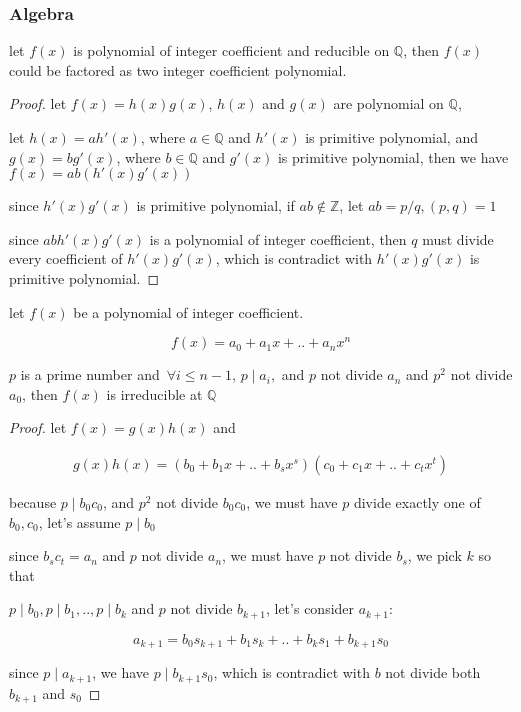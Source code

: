 \subsubsection{Algebra}

\begin{exercise}
let $f(x)$ is polynomial of integer coefficient and reducible on $\mathbb{Q}$, then $f(x)$ could be factored 
as two integer coefficient polynomial.
\end{exercise}

\begin{proof}
    let $f(x) = h(x)g(x)$, $h(x)$ and $g(x)$ are polynomial on $\mathbb{Q}$,    

    let $h(x) = a h'(x)$, where $a \in \mathbb{Q}$ and $h'(x)$ is primitive polynomial, 
    and $g(x) = b g'(x)$, where $b \in \mathbb{Q}$ and $g'(x)$ is primitive polynomial, 
    then we have $f(x) = ab\left(h'(x) g'(x) \right)$

    since $h'(x)g'(x)$ is primitive polynomial, if $ab \notin \mathbb{Z}$, let $ab = p/q, (p, q) = 1$

    since $ab h'(x)g'(x)$ is a polynomial of integer coefficient, then $q$ must divide every coefficient of $h'(x)g'(x)$,
    which is contradict with $h'(x)g'(x)$ is primitive polynomial.

\end{proof}

\begin{exercise}
    let $f(x)$ be a polynomial of integer coefficient. 

    \[
        f(x) = a_0 + a_1x + .. + a_nx^{n}
    \]
    
    $p$ is a prime number and $\, \forall i \le n -1,\, p \mid a_i,$ and $p$ not divide $a_n$ and $p^2$ not divide $a_0$,
    then $f(x)$ is irreducible at $\mathbb{Q}$
\end{exercise}

\begin{proof}
    let $f(x)= g(x)h(x)$ and

    \begin{align*}
        g(x)h(x)= \left(b_0 + b_1x+ .. + b_sx^s \right)\left(c_0 + c_1x+ .. + c_tx^t \right)
    \end{align*}

    because $p \mid b_0c_0$, and $p^2$ not divide $b_0c_0$, we must have $p$ divide exactly one of $b_0, c_0$,
    let's assume $p \mid b_0$

    since $b_sc_t = a_n$ and $p$ not divide $a_n$, we must have $p$ not divide $b_s$, we pick $k$ so that

    $p \mid b_0, p \mid b_1, .., p \mid b_k$ and $p$ not divide $b_{k+1}$, let's consider $a_{k+1}$:

    \[
        a_{k+1} = b_0s_{k+1} + b_1s_{k} + .. + b_{k}s_1 + b_{k+1}s_0
    \]

    since $p \mid a_{k+1}$, we have $p \mid b_{k+1}s_0$, which is contradict with $b$ not divide both $b_{k+1}$ and $s_0$
\end{proof}
